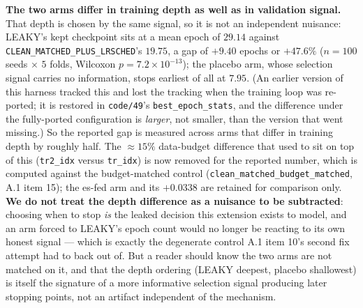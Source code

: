 \documentclass[10pt]{article} %
\begin{document}
\textbf{The two arms differ in training depth as well as in validation signal.}
That depth is chosen by the same signal, so it is not an independent nuisance:
LEAKY's kept checkpoint sits at a mean epoch of $\mathbf{29.14}$ against
\texttt{CLEAN\_MATCHED\_PLUS\_LRSCHED}'s $\mathbf{19.75}$, a gap of $+9.40$
epochs or $+47.6\%$ ($n=100$ seeds $\times$ $5$ folds, Wilcoxon
$p=7.2\times10^{-13}$); the placebo arm, whose selection signal carries no
information, stops earliest of all at $7.95$. (An earlier version of this
harness tracked this and lost the tracking when the training loop was
re-ported; it is restored in \texttt{code/49}'s \texttt{best\_epoch\_stats},
and the difference under the fully-ported configuration is \emph{larger}, not
smaller, than the version that went missing.) So the reported gap is measured
across arms that differ in training depth by roughly half. The
$\approx15\%$ data-budget difference that used to sit on top of this
(\texttt{tr2\_idx} versus \texttt{tr\_idx}) is now removed for the reported
number, which is computed against the budget-matched control
(\texttt{clean\_matched\_budget\_matched}, A.1 item 15); the es-fed arm and its
$+0.0338$ are retained for comparison only. \textbf{We do not treat the depth
difference as a nuisance to be subtracted}: choosing when to stop \emph{is} the
leaked decision this extension exists to model, and an arm forced to LEAKY's
epoch count would no longer be reacting to its own honest signal --- which is
exactly the degenerate control A.1 item 10's second fix attempt had to back out of. But a reader should know the two arms are not matched on it, and
that the depth ordering (LEAKY deepest, placebo shallowest) is itself the
signature of a more informative selection signal producing later stopping
points, not an artifact independent of the mechanism.
\end{document}
